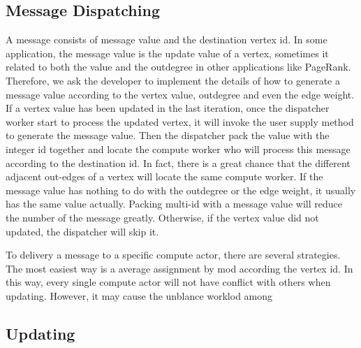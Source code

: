 \documentclass[twocolumn,a4paper,10pt]{article}
\begin{document}
\subsection{Message Dispatching}
A message consists of message value and the destination vertex id. In some application, the message value is the update value of a vertex, sometimes it related to both the value and the outdegree in other applications like PageRank. Therefore, we ask the developer to implement the details of how to generate a message value according to the vertex value, outdegree and even the edge weight. If a vertex value has been updated in the last iteration, once the dispatcher worker start to process the updated vertex, it will invoke the user supply method to generate the message value. Then the dispatcher pack the value with the integer id together and locate the compute worker who will process this message according to the destination id. In fact, there is a great chance that the different adjacent out-edges of a vertex will locate the same compute worker. If the message value has nothing to do with the outdegree or the edge weight, it usually has the same value actually. Packing multi-id with a message value will reduce the number of the message greatly. Otherwise, if the vertex value did not updated, the dispatcher will skip it.

To delivery a message to a specific compute actor, there are several strategies. The most easiest way is a average assignment by mod according the vertex id. In this way, every single compute actor will not have conflict with others when updating. However, it may cause the unblance worklod among 

\subsection{Updating}
\end{document}
